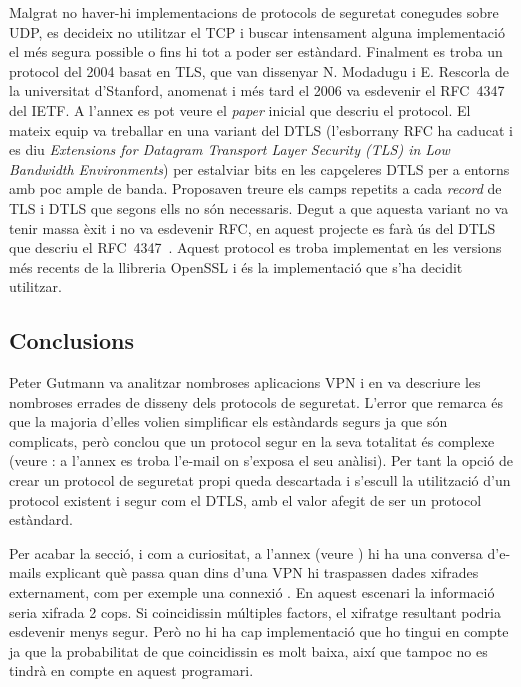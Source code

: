 Malgrat no haver-hi implementacions de protocols de seguretat conegudes sobre UDP, es decideix no utilitzar el TCP i buscar intensament alguna implementació el més segura possible o fins hi tot a poder ser estàndard. Finalment es troba un protocol del 2004 basat en TLS, que van dissenyar N. Modadugu i E. Rescorla de la universitat d'Stanford, anomenat  i més tard el 2006 va esdevenir el RFC~4347~\cite{rfc4347} del IETF. A l'annex  es pot veure el \emph{paper} inicial que descriu el protocol. El mateix equip va treballar en una variant del DTLS \cite{rfc-dtls-short} (l'esborrany RFC ha caducat i es diu \emph{Extensions for Datagram Transport Layer Security (TLS) in Low Bandwidth Environments}) per estalviar bits en les capçeleres DTLS per a entorns amb poc ample de banda. Proposaven treure els camps repetits a cada \emph{record} de TLS i DTLS que segons ells no són necessaris. Degut a que aquesta variant no va tenir massa èxit i no va esdevenir RFC, en aquest projecte es farà ús del DTLS que descriu el RFC~4347~\cite{rfc4347}. Aquest protocol es troba implementat en les versions més recents de la llibreria OpenSSL i és la implementació que s'ha decidit utilitzar.

\subsection{Conclusions}
Peter Gutmann va analitzar nombroses aplicacions VPN i en va descriure les nombroses errades de disseny dels protocols de seguretat. L'error que remarca és que la majoria d'elles volien simplificar els estàndards segurs ja que són complicats, però conclou que un protocol segur en la seva totalitat és complexe (veure \cite{latm-metzdowd}: a l'annex  es troba l'e-mail on s'exposa el seu anàlisi).
Per tant la opció de crear un protocol de seguretat propi queda descartada i s'escull la utilització d'un protocol existent i segur com el DTLS, amb el valor afegit de ser un protocol estàndard.

Per acabar la secció, i com a curiositat, a l'annex  (veure \cite{deq-metzdowd}) hi ha una conversa d'e-mails explicant què passa quan dins d'una VPN hi traspassen dades xifrades externament, com per exemple una connexió . En aquest escenari la informació seria xifrada 2 cops. Si coincidissin múltiples factors, el xifratge resultant podria esdevenir menys segur. Però no hi ha cap implementació que ho tingui en compte ja que la probabilitat de que coincidissin es molt baixa, així que tampoc no es tindrà en compte en aquest programari.

